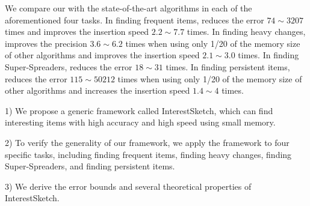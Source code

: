 
We compare our \aname{} with the state-of-the-art algorithms in each of the aforementioned four tasks.
In finding frequent items, \aname{} reduces the error $74\sim 3207$ times and improves the insertion speed $2.2\sim 7.7$ times. In finding heavy changes, \aname{} improves the precision $3.6\sim 6.2$ times when using only 1/20 of the memory size of other algorithms and improves the insertion speed $2.1\sim 3.0$ times. In finding Super-Spreaders, \aname{} reduces the error $18\sim 31$ times. In finding persistent items, \aname{} reduces the error $115\sim 50212$ times when using only 1/20 of the memory size of other algorithms and increases the insertion speed $1.4\sim 4$ times.




1) We propose a generic framework called InterestSketch, which can find interesting items with high accuracy and high speed using small memory.

	2) To verify the generality of our framework, we apply the framework to four specific tasks, including finding frequent items, finding heavy changes, finding Super-Spreaders, and finding persistent items.

3) We derive the error bounds and several theoretical properties of InterestSketch.

